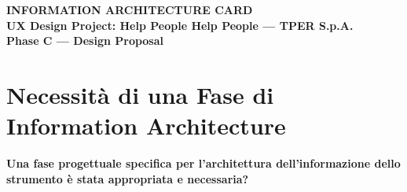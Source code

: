 ﻿
\begin{tcolorbox}[colback=primaryColor,colframe=primaryColor,arc=3mm,halign=center,valign=center,height=2.5cm]
 \color{white}\LARGE\bfseries INFORMATION ARCHITECTURE CARD \\[0.2cm]
 \color{white!80}\large UX Design Project: Help People Help People --- TPER S.p.A. \\[0.1cm]
 \color{white!60}\normalsize Phase C --- Design Proposal
\end{tcolorbox}

\vspace{0.5cm}

\section{Necessità di una Fase di Information Architecture}

\begin{tcolorbox}[colback=primaryColor!10,colframe=primaryColor,arc=2mm]
\large\textbf{Una fase progettuale specifica per l'architettura dell'informazione dello strumento è stata appropriata e necessaria?} \\[4pt]
 \;  \quad {} \; 
\end{tcolorbox}

\vspace{0.3cm}

